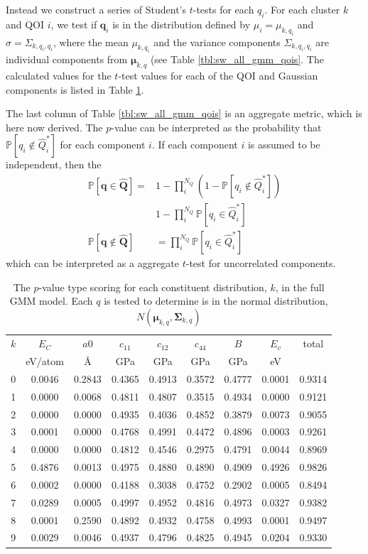 Instead we construct a series of Student's $t$-tests for each $q_i$.  For each cluster $k$ and QOI $i$, we test if $\bm{q}_i$ is in the distribution defined by $\mu_i = \mu_{k,q_i}$ and $\sigma = \Sigma_{k,q_i,q_i}$, where the  mean $\mu_{k,q_i}$ and the variance components $\Sigma_{k,q_i,q_i}$ are individual components from $\bm{\mu}_{k,q}$ (see Table \ref{tbl:sw_all_gmm_qois}.
The calculated values for the $t$-test values for each of the QOI and Gaussian components is listed in Table \ref{tbl:sw_all_gmm_ttest}.

The last column of Table \ref{tbl:sw_all_gmm_qois} is an aggregate metric, which is here now derived.  The $p$-value can be interpreted as the probability that $\mathbb{P}[q_i\notin \hat{Q}_i^*]$ for each component $i$.  If each component $i$ is assumed to be independent, then the
\begin{align}
  \mathbb{P}[\bm{q} \in \hat{\bm{Q}}]
  =
  & 1 - \prod_i^{N_Q} \left(1 - \mathbb{P}[q_i \notin \hat{Q}_i^*]\right) \\
  & 1 - \prod_i^{N_Q} \mathbb{P}[q_i \in \hat{Q}_i^*] \\
  \mathbb{P}[\bm{q} \notin \hat{\bm{Q}}]
  &= \prod_i^{N_Q} \mathbb{P}[q_i \in \hat{Q}_i^*]
  \label{eq:aggregate_t_test}
\end{align}
which can be interpreted as a aggregate $t$-test for uncorrelated components.

\begin{table}[ht]
	\centering
	\caption{The $p$-value type scoring for each constituent distribution, $k$, in the full GMM model. Each $q$ is tested to determine is in the normal distribution, $N(\bm{\mu}_{k,q}, \bm{\Sigma}_{k,q})$}
	\label{tbl:sw_all_gmm_ttest}
	\begin{tabular}{ccccccccc}
		\hline
		$k$ & $E_C$ & $a0$ & $c_{11}$ & $c_{12}$ & $c_{44}$ & $B$ & $E_v$ & total \\
		    & eV/atom & \AA & GPa & GPa & GPa & GPa & eV & \\
		\hline
		0 & 0.0046 & 0.2843 & 0.4365 & 0.4913 & 0.3572 & 0.4777 & 0.0001 & 0.9314\\
		1 & 0.0000 & 0.0068 & 0.4811 & 0.4807 & 0.3515 & 0.4934 & 0.0000 & 0.9121\\
		2 & 0.0000 & 0.0000 & 0.4935 & 0.4036 & 0.4852 & 0.3879 & 0.0073 & 0.9055\\
		3 & 0.0001 & 0.0000 & 0.4768 & 0.4991 & 0.4472 & 0.4896 & 0.0003 & 0.9261\\
		4 & 0.0000 & 0.0000 & 0.4812 & 0.4546 & 0.2975 & 0.4791 & 0.0044 & 0.8969\\
		5 & 0.4876 & 0.0013 & 0.4975 & 0.4880 & 0.4890 & 0.4909 & 0.4926 & 0.9826\\
		6 & 0.0002 & 0.0000 & 0.4188 & 0.3038 & 0.4752 & 0.2902 & 0.0005 & 0.8494\\
		7 & 0.0289 & 0.0005 & 0.4997 & 0.4952 & 0.4816 & 0.4973 & 0.0327 & 0.9382\\
		8 & 0.0001 & 0.2590 & 0.4892 & 0.4932 & 0.4758 & 0.4993 & 0.0001 & 0.9497\\
		9 & 0.0029 & 0.0046 & 0.4937 & 0.4796 & 0.4825 & 0.4945 & 0.0204 & 0.9330\\
		\hline
	\end{tabular}
\end{table}

